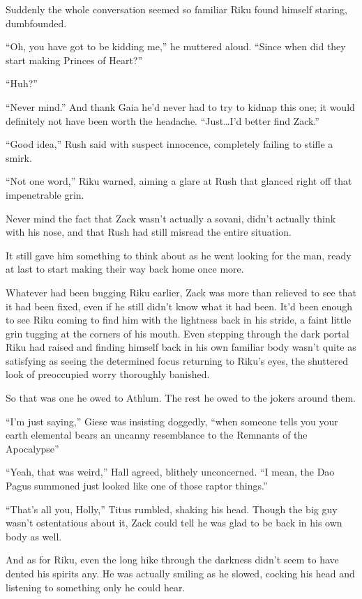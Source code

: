 Suddenly the whole conversation seemed so familiar Riku found himself staring, dumbfounded.

``Oh, you have got to be kidding me,'' he muttered aloud. ``Since when did they start making Princes of Heart?''

``Huh?''

``Never mind.'' And thank Gaia he'd never had to try to kidnap this one; it would definitely not have been worth the headache. ``Just\ldots I'd better find Zack.''

``Good idea,'' Rush said with suspect innocence, completely failing to stifle a smirk.

``Not one word,'' Riku warned, aiming a glare at Rush that glanced right off that impenetrable grin.

Never mind the fact that Zack wasn't actually a sovani, didn't actually think with his nose, and that Rush had still misread the entire situation.

It still gave him something to think about as he went looking for the man, ready at last to start making their way back home once more.


\scenechange


Whatever had been bugging Riku earlier, Zack was more than relieved to see that it had been fixed, even if he still didn't know what it had been. It'd been enough to see Riku coming to find him with the lightness back in his stride, a faint little grin tugging at the corners of his mouth. Even stepping through the dark portal Riku had raised and finding himself back in his own familiar body wasn't quite as satisfying as seeing the determined focus returning to Riku's eyes, the shuttered look of preoccupied worry thoroughly banished.

So that was one he owed to Athlum. The rest he owed to the jokers around them.

``I'm just saying,'' Giese was insisting doggedly, ``when someone tells you your earth elemental bears an uncanny resemblance to the Remnants of the Apocalypse\textemdash''

``Yeah, that was weird,'' Hall agreed, blithely unconcerned. ``I mean, the Dao Pagus summoned just looked like one of those raptor things.''

``That's all you, Holly,'' Titus rumbled, shaking his head. Though the big guy wasn't ostentatious about it, Zack could tell he was glad to be back in his own body as well.

And as for Riku, even the long hike through the darkness didn't seem to have dented his spirits any. He was actually smiling as he slowed, cocking his head and listening to something only he could hear.

